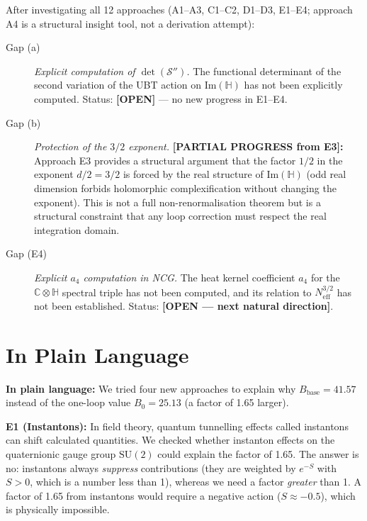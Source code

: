 \documentclass[11pt,a4paper]{article}
\theoremstyle{definition}
\theoremstyle{remark}
\begin{document}
After investigating all 12 approaches (A1--A3, C1--C2, D1--D3, E1--E4;
approach A4 is a structural insight tool, not a derivation attempt):
\begin{description}
  \item[Gap (a)] \textit{Explicit computation of $\det(\mathcal{S}'')$.}
    The functional determinant of the second variation of the UBT action on
    $\mathrm{Im}(\mathbb{H})$ has not been explicitly computed.
    Status: \textbf{[OPEN]} — no new progress in E1--E4.

  \item[Gap (b)] \textit{Protection of the $3/2$ exponent.}
    \textbf{[PARTIAL PROGRESS from E3]:}
    Approach E3 provides a structural argument that the factor $1/2$ in the exponent
    $d/2 = 3/2$ is forced by the real structure of $\mathrm{Im}(\mathbb{H})$
    (odd real dimension forbids holomorphic complexification without changing the
    exponent). This is not a full non-renormalisation theorem but is a structural
    constraint that any loop correction must respect the real integration domain.

  \item[Gap (E4)] \textit{Explicit $a_4$ computation in NCG.}
    The heat kernel coefficient $a_4$ for the $\mathbb{C}\otimes\mathbb{H}$
    spectral triple has not been computed, and its relation to $N_{\mathrm{eff}}^{3/2}$
    has not been established.
    Status: \textbf{[OPEN — next natural direction]}.
\end{description}

\section{In Plain Language}
\label{sec:plain}

\textbf{In plain language:}
We tried four new approaches to explain why $B_{\mathrm{base}} = 41.57$ instead of
the one-loop value $B_0 = 25.13$ (a factor of 1.65 larger).

\textbf{E1 (Instantons):} In field theory, quantum tunnelling effects
called instantons can shift calculated quantities.
We checked whether instanton effects on the quaternionic gauge group $\mathrm{SU}(2)$
could explain the factor of 1.65.
The answer is no: instantons always \emph{suppress} contributions
(they are weighted by $e^{-S}$ with $S > 0$, which is a number less than 1),
whereas we need a factor \emph{greater} than 1.
A factor of 1.65 from instantons would require a negative action ($S \approx -0.5$),
which is physically impossible.
\end{document}
